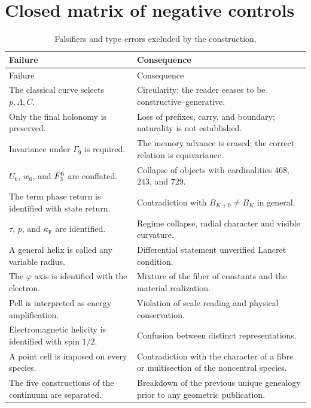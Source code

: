 \section{Closed matrix of negative controls}

\begin{longtable}{p{}p{}}
\caption{Falsifiers and type errors excluded by the construction.}
\label{espiral:tab:falsadores-ap}\\
\toprule
Failure&Consequence\\
\midrule
\endfirsthead
\toprule
Failure&Consequence\\
\midrule
\endhead
The classical curve selects \(p,\Lambda,C\).&Circularity: the reader ceases
to be constructive--generative.\\
Only the final holonomy is preserved.&Loss of prefixes, carry, and boundary;
naturality is not established.\\
Invariance under \(\Gamma_9\) is required.&The memory advance is erased; the
correct relation is equivariance.\\
\(U_6\), \(w_6\), and \(F_3^6\) are conflated.&Collapse of objects with
cardinalities \(468\), \(243\), and \(729\).\\
The term phase return is identified with state return.&Contradiction with
\(B_{K+9}\neq B_K\) in general.\\
\(\tau\), \(p\), and \(\kappa_{\mathrm{F}}\) are identified.&Regime collapse,
radial character and visible curvature.\\
A general helix is called any variable radius.&Differential statement
unverified Lancret condition.\\
The \(\varphi\) axis is identified with the electron.&Mixture of the fiber of
constants and the material realization.\\
Pell is interpreted as energy amplification.&Violation of scale reading and physical conservation.\\
Electromagnetic helicity is identified with spin \(1/2\).&Confusion between
distinct representations.\\
A point cell is imposed on every species.&Contradiction with the character
of a fibre or multisection of the noncentral species.\\
The five constructions of the continuum are separated.&Breakdown of the previous unique genealogy prior to any geometric publication.\\
\bottomrule
\end{longtable}

